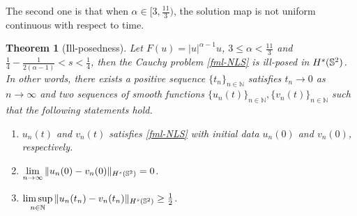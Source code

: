 \documentclass[10pt,a4paper]{amsart}
\numberwithin{equation}{section}
\newtheorem{theorem}{Theorem}[section]
\begin{document}
	
The second one is that when $\alpha\in[3,\frac{11}{3})$, the solution map is not uniform continuous with respect to time.  
\begin{theorem}[Ill-posedness]\label{thm-illpose2}
Let $F(u) = |u|^{\alpha-1}u$, $3\leq \alpha< \frac{11}{3}$ and $\frac{1}{4}-\frac{1}{2(\alpha-1)}<s<\frac{1}{4}$, then the Cauchy problem \eqref{fml-NLS} is ill-posed in $H^s(\Bbb S^2)$. In other words, there exists a positive sequence $\{t_n\}_{n\in\mathbb{N}}$ satisfies $t_n\to 0$ as $n\to\infty$ and two sequences of smooth functions $\{u_n(t)\}_{n\in\mathbb{N}},\{v_n(t)\}_{n\in\mathbb{N}}$ such that the following statements hold.
\begin{enumerate}
\item $u_n(t)$ and $v_n(t)$ satisfies \eqref{fml-NLS} with initial data $u_n(0)$ and $v_n(0)$, respectively.
\item $\lim\limits_{n\to\infty}\|u_n(0)-v_n(0)\|_{H^s(\Bbb S^2)} = 0$.
\item $\limsup\limits_{n\in \mathbb{N}}\|u_n(t_n)-v_n(t_n)\|_{H^s(\Bbb S^2)} \ge \frac{1}{2}$. 
\end{enumerate}
\end{theorem}
	
\end{document}

